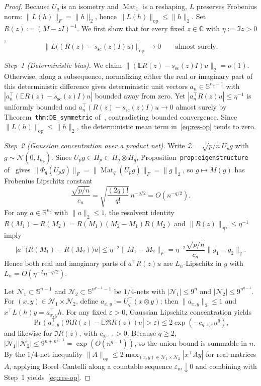 \documentclass[11pt]{article}
\theoremstyle{plain}
\theoremstyle{definition}
\theoremstyle{remark}
\DeclareMathOperator{\Mat}{Mat}
\begin{document}
\begin{proof}
Because $U_q$ is an isometry and $\Mat_1$ is a reshaping, $L$ preserves Frobenius norm: $\|L(h)\|_F = \|h\|_2$, hence $\|L(h)\|_{\mathrm{op}} \le \|h\|_2$. Set $R(z) := (M - zI)^{-1}$. We first show that for every fixed $z \in \mathbb{C}$ with $\eta := \Im z > 0$,
\begin{equation}\label{eq:res-op}
\bigl\|L\bigl((R(z) - s_{\mathrm{sc}}(z)I)u\bigr)\bigr\|_{\mathrm{op}} \longrightarrow 0
\qquad \text{almost surely.}
\end{equation}

\emph{Step~1 (Deterministic bias).} We claim $\|(\mathbb{E} R(z) - s_{\mathrm{sc}}(z)I)u\|_2 = o(1)$. Otherwise, along a subsequence, normalizing either the real or imaginary part of this deterministic difference gives deterministic unit vectors $a_n \in \mathbb{S}^{n_q - 1}$ with $|a_n^\top(\mathbb{E} R(z) - s_{\mathrm{sc}}(z)I)u|$ bounded away from zero. Yet $|a_n^\top R(z) u| \le \eta^{-1}$ is uniformly bounded and $a_n^\top(R(z) - s_{\mathrm{sc}}(z)I)u \to 0$ almost surely by Theorem~\texttt{thm:DE\_symmetric} of~\cite{Szwagier2026}, contradicting bounded convergence. Since $\|L(h)\|_{\mathrm{op}} \le \|h\|_2$, the deterministic mean term in~\eqref{eq:res-op} tends to zero.

\emph{Step~2 (Gaussian concentration over a product net).} Write $\mathcal{Z} = \sqrt{p/n}\, U_p g$ with $g \sim \mathcal{N}(0, I_{n_p})$. Since $U_p g \in H_p \subset H_q \otimes H_q$, Proposition~\texttt{prop:eigenstructure} of~\cite{Szwagier2026} gives $\|\Phi_q(U_p g)\|_F = \|\Mat_q(U_p g)\|_F = \|g\|_2$, so $g \mapsto M(g)$ has Frobenius Lipschitz constant
\[
\frac{\sqrt{p/n}}{c_n} = \sqrt{\frac{(2q)!}{q!}}\, n^{-q/2} = O(n^{-q/2}).
\]
For any $a \in \mathbb{R}^{n_q}$ with $\|a\|_2 \le 1$, the resolvent identity $R(M_1) - R(M_2) = R(M_1)(M_2 - M_1)R(M_2)$ and $\|R(z)\|_{\mathrm{op}} \le \eta^{-1}$ imply
\[
\bigl|a^\top\bigl(R(M_1) - R(M_2)\bigr)u\bigr|
\le \eta^{-2} \|M_1 - M_2\|_F
= \eta^{-2}\frac{\sqrt{p/n}}{c_n}\|g_1 - g_2\|_2.
\]
Hence both real and imaginary parts of $a^\top R(z) u$ are $L_n$-Lipschitz in $g$ with $L_n = O(\eta^{-2} n^{-q/2})$.

Let $\mathcal{N}_1 \subset \mathbb{S}^{n-1}$ and $\mathcal{N}_2 \subset \mathbb{S}^{n^{q-1}-1}$ be $1/4$-nets with $|\mathcal{N}_1| \le 9^n$ and $|\mathcal{N}_2| \le 9^{n^{q-1}}$. For $(x, y) \in \mathcal{N}_1 \times \mathcal{N}_2$, define $a_{x,y} := U_q^\top(x \otimes y)$; then $\|a_{x,y}\|_2 \le 1$ and $x^\top L(h) y = a_{x,y}^\top h$. For any fixed $\varepsilon > 0$, Gaussian Lipschitz concentration yields
\[
\Pr\bigl(|a_{x,y}^\top(\Re R(z) - \mathbb{E}\Re R(z))u| > \varepsilon\bigr) \le 2\exp(-c_{q,z,\varepsilon} n^q),
\]
and likewise for $\Im R(z)$, with $c_{q,z,\varepsilon} > 0$. Because $q \ge 2$, $|\mathcal{N}_1||\mathcal{N}_2| \le 9^{n + n^{q-1}} = \exp(O(n^{q-1}))$, so the union bound is summable in $n$. By the $1/4$-net inequality $\|A\|_{\mathrm{op}} \le 2\max_{(x,y)\in\mathcal{N}_1\times\mathcal{N}_2} |x^\top A y|$ for real matrices $A$, applying Borel--Cantelli along a countable sequence $\varepsilon_m \downarrow 0$ and combining with Step~1 yields~\eqref{eq:res-op}.


\end{proof}
\end{document}
